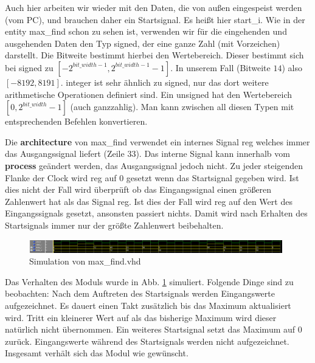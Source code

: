

Auch hier arbeiten wir wieder mit den Daten, die von außen eingespeist werden (vom PC), und brauchen daher ein Startsignal.
Es heißt hier start\_i.
Wie in der entity max\_find schon zu sehen ist, verwenden wir für die eingehenden und ausgehenden Daten den Typ \glqq signed\grqq{}, der eine ganze Zahl (mit Vorzeichen) darstellt.
Die Bitweite bestimmt hierbei den Wertebereich. Dieser bestimmt sich bei signed zu $[-2^{bit\_width - 1}, 2^{bit\_width - 1} - 1]$.
In unserem Fall (Bitweite $14$) also $[-8192, 8191]$.
\glqq integer \grqq{} ist sehr ähnlich zu signed, nur das dort weitere arithmetische Operationen definiert sind.
Ein \glqq unsigned \grqq{} hat den Wertebereich $[0, 2^{bit\_width} - 1]$ (auch ganzzahlig).
Man kann zwischen all diesen Typen mit entsprechenden Befehlen konvertieren.

Die \textbf{architecture} von max\_find verwendet ein internes Signal \glqq reg\grqq{} welches immer das Ausgangssignal liefert (Zeile $33$).
Das interne Signal kann innerhalb vom \textbf{process} geändert werden, das Ausgangssignal jedoch nicht.
Zu jeder steigenden Flanke der Clock wird reg auf $0$ gesetzt wenn das Startsignal gegeben wird.
Ist dies nicht der Fall wird überprüft ob das Eingangssignal einen größeren Zahlenwert hat als das Signal reg.
Ist dies der Fall wird reg auf den Wert des Eingangssignals gesetzt, ansonsten passiert nichts.
Damit wird nach Erhalten des Startsignals immer nur der größte Zahlenwert beibehalten.

\begin{figure}[ht]
	\centering
    \includegraphics[width=0.98\textwidth]{../Daten/max_find.png}
	\caption{Simulation von max\_find.vhd}
	\label{img_max_find}
\end{figure}

Das Verhalten des Moduls wurde in Abb. \ref{img_max_find} simuliert.
Folgende Dinge sind zu beobachten:
Nach dem Auftreten des Startsignals werden Eingangswerte aufgezeichnet.
Es dauert einen Takt zusätzlich bis das Maximum aktualisiert wird.
Tritt ein kleinerer Wert auf als das bisherige Maximum wird dieser natürlich nicht übernommen.
Ein weiteres Startsignal setzt das Maximum auf $0$ zurück.
Eingangswerte während des Startsignals werden nicht aufgezeichnet.
Insgesamt verhält sich das Modul wie gewünscht.

